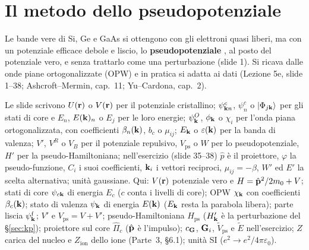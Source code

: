\documentclass[11pt,a4paper]{article}
\begin{document}
\section{Il metodo dello pseudopotenziale}\label{sec:pseudo}
Le bande vere di Si, Ge e GaAs si ottengono con gli elettroni quasi liberi, ma con un potenziale efficace debole e liscio, lo
\textbf{pseudopotenziale} , al posto del potenziale vero, e senza trattarlo come una perturbazione (slide 1). Si ricava dalle
onde piane ortogonalizzate (OPW) e in pratica si adatta ai dati (Lezione 5e, slide 1--38; Ashcroft--Mermin, cap.~11; Yu--Cardona, cap.~2).

\begin{osservazione}[notazione]
Le slide scrivono $U(\mathbf r)$ o $V(\mathbf r)$ per il potenziale cristallino; $\psi^c_{\mathbf k n}$, $\psi^c_n$ o $|\Phi_{j\mathbf k}\rangle$ per gli stati di core e
$E_n$, $E(\mathbf k)_n$ o $E_j$ per le loro energie; $\psi^O_{\mathbf k}$, $\phi_{\mathbf k}$ o $\chi_i$ per l'onda piana ortogonalizzata, con coefficienti
$\beta_n(\mathbf k)$, $b_c$ o $\mu_{ij}$; $E_{\mathbf k}$ o $\varepsilon(\mathbf k)$ per la banda di valenza; $V'$, $V^R$ o $V_B$ per il potenziale repulsivo,
$V_{\mathrm{ps}}$ o $W$ per lo pseudopotenziale, $H'$ per la pseudo-Hamiltoniana; nell'esercizio (slide 35--38) $\hat p$ è il proiettore,
$\varphi$ la pseudo-funzione, $C_i$ i suoi coefficienti, $\mathbf k_i$ i vettori reciproci, $\mu_{ij}=-\beta$, $W'$ ed $E'$ la scelta alternativa; unità
gaussiane. Qui: $V(\mathbf r)$ potenziale vero e $H=\hat{\mathbf p}^2/2m_0+V$; stati di core $\psi_{c\mathbf k}$ di energia $E_c$ ($c$ conta i livelli
di core); OPW $\chi_{\mathbf k}$ con coefficienti $\beta_c(\mathbf k)$; stato di valenza $\psi_{\mathbf k}$ di energia $E(\mathbf k)$ ($E_{\mathbf k}$ resta la parabola libera);
parte liscia $\psi^{\mathrm f}_{\mathbf k}$; $V'$ e $V_{\mathrm{ps}}=V+V'$; pseudo-Hamiltoniana $H_{\mathrm{ps}}$ ($H'_{\mathbf k}$ è la perturbazione del
§\ref{sec:kp}); proiettore sul core $\hat\Pi_c$ ($\hat{\mathbf p}$ è l'impulso); $c_{\mathbf G}$, $\mathbf G_i$, $\tilde V_{\mathrm{ps}}$ e $\tilde E$ nell'esercizio; $Z$ carica del nucleo e $Z_{\mathrm{ion}}$ dello ione (Parte~3, §6.1); unità SI
($e^2\to e^2/4\pi\varepsilon_0$).
\end{osservazione}
\end{document}
